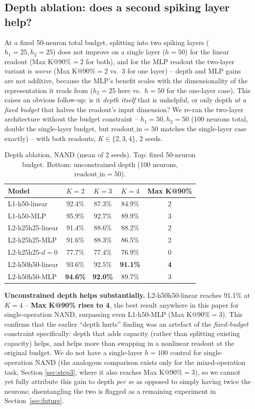 \documentclass[conference]{IEEEtran}
\begin{document}
\subsection{Depth ablation: does a second spiking layer help?}
At a fixed 50-neuron total budget, splitting into two spiking layers
($h_1{=}25,h_2{=}25$) does not improve on a single layer ($h{=}50$) for the linear
readout (Max K@90\%$=2$ for both), and for the MLP readout the two-layer variant is
\emph{worse} (Max K@90\%$=2$ vs.\ 3 for one layer) -- depth and MLP gains are not
additive, because the MLP's benefit scales with the dimensionality of the
representation it reads from ($h_2{=}25$ here vs.\ $h{=}50$ for the one-layer case). This
raises an obvious follow-up: is it \emph{depth itself} that is unhelpful, or only depth
\emph{at a fixed budget} that halves the readout's input dimension? We re-ran the
two-layer architecture without the budget constraint -- $h_1{=}50,h_2{=}50$ (100 neurons
total, double the single-layer budget, but $\text{readout\_in}{=}50$ matches the
single-layer case exactly) -- with both readouts, $K\in\{2,3,4\}$, 2 seeds.

\begin{table}[t]
\centering
\caption{Depth ablation, NAND (mean of 2 seeds). Top: fixed 50-neuron budget. Bottom:
unconstrained depth (100 neurons, $\text{readout\_in}{=}50$).}
\label{tab:depth}
\begin{tabular}{lcccc}
\toprule
Model & $K{=}2$ & $K{=}3$ & $K{=}4$ & Max K@90\% \\
\midrule
L1-h50-linear & 92.4\% & 87.3\% & 84.9\% & 2 \\
L1-h50-MLP & 95.9\% & 92.7\% & 89.9\% & 3 \\
L2-h25h25-linear & 91.4\% & 88.6\% & 88.2\% & 2 \\
L2-h25h25-MLP & 91.6\% & 88.3\% & 86.5\% & 2 \\
L2-h25h25-$d{=}0$ & 77.7\% & 77.4\% & 76.9\% & 0 \\
\midrule
L2-h50h50-linear & 93.6\% & 92.5\% & \textbf{91.1\%} & \textbf{4} \\
L2-h50h50-MLP & \textbf{94.6\%} & \textbf{92.0\%} & 89.7\% & 3 \\
\bottomrule
\end{tabular}
\end{table}

\textbf{Unconstrained depth helps substantially.} L2-h50h50-linear reaches 91.1\% at
$K{=}4$ -- \textbf{Max K@90\% rises to 4}, the best result anywhere in this paper for
single-operation NAND, surpassing even L1-h50-MLP (Max K@90\%$=$3). This confirms that
the earlier ``depth hurts'' finding was an artefact of the \emph{fixed-budget}
constraint specifically: depth that adds capacity (rather than splitting existing
capacity) helps, and helps more than swapping in a nonlinear readout at the original
budget. We do not have a single-layer $h{=}100$ control for single-operation NAND (the
analogous comparison exists only for the mixed-operation task, Section \ref{sec:step3},
where it also reaches Max K@90\%$=$3), so we cannot yet fully attribute this gain to
depth \emph{per se} as opposed to simply having twice the neurons; disentangling the two
is flagged as a remaining experiment in Section~\ref{sec:future}.
\end{document}
